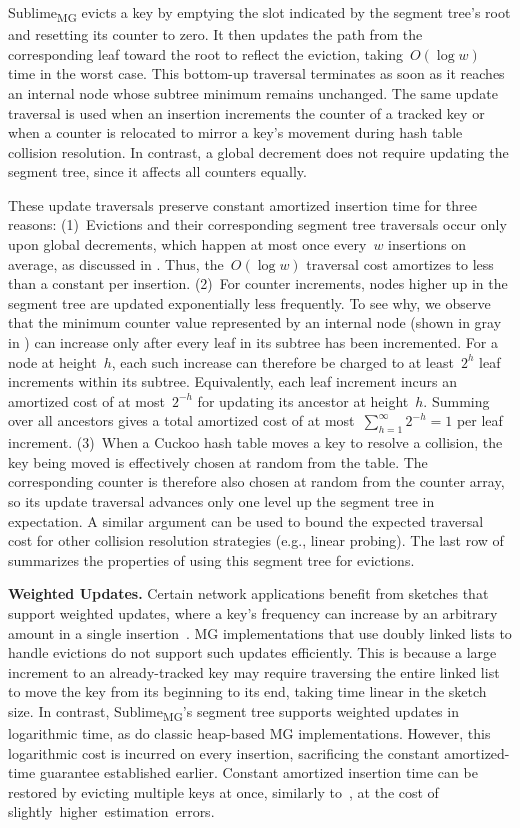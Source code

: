 \documentclass[sigconf]{acmart}
\newcommand{\sketch}{Sublime}
\newcommand{\sketchmg}{\sketch\textsubscript{MG}\xspace}
\begin{document}
\sketchmg evicts a key by emptying the slot indicated by the segment tree's root and resetting its counter to zero.
It then updates the path from the corresponding leaf toward the root to reflect the eviction, taking~$O(\log w)$ time in the worst case.
This bottom-up traversal terminates as soon as it reaches an internal node whose subtree minimum remains unchanged.
The same update traversal is used when an insertion increments the counter of a tracked key or when a counter is relocated to mirror a key's movement during hash table collision resolution.
In contrast, a global decrement does not require updating the segment tree, since it affects all counters equally.

These update traversals preserve constant amortized insertion time for three reasons:
(1)~Evictions and their corresponding segment tree traversals occur only upon global decrements, which happen at most once every~$w$ insertions on average, as discussed in .
Thus, the~$O(\log w)$ traversal cost amortizes to less than a constant per insertion.
(2)~For counter increments, nodes higher up in the segment tree are updated exponentially less frequently.
To see why, we observe that the minimum counter value represented by an internal node (shown in gray in ) can increase only after every leaf in its subtree has been incremented.
For a node at height~$h$, each such increase can therefore be charged to at least~$2^h$ leaf increments within its subtree.
Equivalently, each leaf increment incurs an amortized cost of at most~$2^{-h}$ for updating its ancestor at height~$h$.
Summing over all ancestors gives a total amortized cost of at most~$\sum_{h=1}^{\infty}2^{-h}=1$ per leaf increment.
(3)~When a Cuckoo hash table moves a key to resolve a collision, the key being moved is effectively chosen at random from the table.
The corresponding counter is therefore also chosen at random from the counter array, so its update traversal advances only one level up the segment tree in expectation.
A similar argument can be used to bound the expected traversal cost for other collision resolution strategies (e.g., linear probing).
The last row of  summarizes the properties of using this segment tree for evictions.

\textbf{Weighted Updates.}
Certain network applications benefit from sketches that support weighted updates, where a key's frequency can increase by an arbitrary amount in a single insertion~\cite{BatchUpdateMisraGries}.
MG implementations that use doubly linked lists to handle evictions do not support such updates efficiently.
This is because a large increment to an already-tracked key may require traversing the entire linked list to move the key from its beginning to its end, taking time linear in the sketch size.
In contrast, \sketchmg's segment tree supports weighted updates in logarithmic time, as do classic heap-based MG implementations.
However, this logarithmic cost is incurred on every insertion, sacrificing the constant amortized-time guarantee established earlier.
Constant amortized insertion time can be restored by evicting multiple keys at once, similarly to~\cite{BatchUpdateMisraGries}, at the cost of \mbox{slightly higher estimation errors}.
\end{document}
